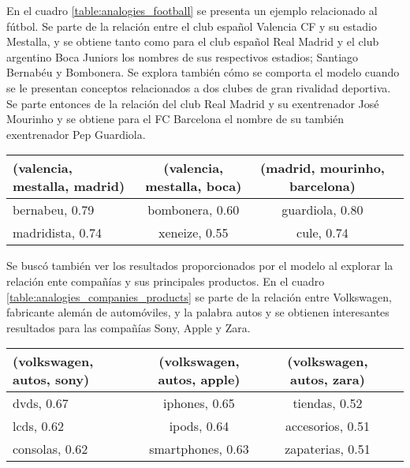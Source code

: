 En el cuadro \ref{table:analogies_football} se presenta un ejemplo relacionado al fútbol. Se
parte de la relación entre el club español Valencia CF y su estadio Mestalla, y se obtiene tanto
como para el club español Real Madrid y el club argentino Boca Juniors los nombres de sus
respectivos estadios; Santiago Bernabéu y Bombonera. Se explora también cómo se
comporta el modelo cuando se le presentan conceptos relacionados a dos clubes de gran
rivalidad deportiva. Se parte entonces de la relación del club Real Madrid y su exentrenador
José Mourinho y se obtiene para el FC Barcelona el nombre de su también exentrenador Pep
Guardiola.

\begin{table*}[ht]
    \centering
    \begin{tabular}{lccc}
        \hline
        (valencia, mestalla, madrid) & (valencia, mestalla, boca) & (madrid, mourinho, barcelona)\\
        \hline
        bernabeu, 0.79 & bombonera, 0.60 & guardiola, 0.80\\
        madridista, 0.74 & xeneize, 0.55 & cule, 0.74\\
        \hline
    \end{tabular}
    \caption{Analogías relacionadas al fútbol.}
    \label{table:analogies_football}
\end{table*}

Se buscó también ver los resultados proporcionados por el modelo al explorar la relación
ente compañías y sus principales productos. En el cuadro
\ref{table:analogies_companies_products} se parte de la relación entre Volkswagen, fabricante
alemán de automóviles, y la palabra autos y se obtienen interesantes resultados para las
compañías Sony, Apple y Zara.

\begin{table*}[ht]
    \centering
    \begin{tabular}{lccc}
        \hline
        (volkswagen, autos, sony) & (volkswagen, autos, apple) & (volkswagen, autos, zara)\\
        \hline
        dvds, 0.67 & iphones, 0.65 & tiendas, 0.52\\
        lcds, 0.62 & ipods, 0.64 & accesorios, 0.51\\
        consolas, 0.62 & smartphones, 0.63 & zapaterias, 0.51\\
        \hline
    \end{tabular}
    \caption{Analogías relacionadas a marcas y sus productos.}
    \label{table:analogies_companies_products}
\end{table*}

